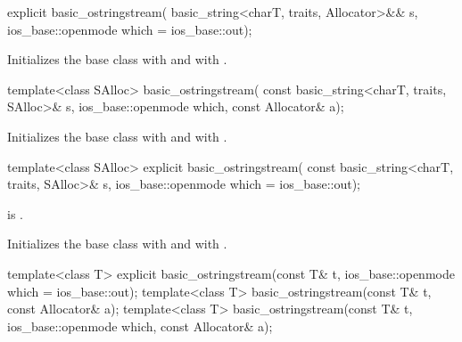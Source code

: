 %
\begin{itemdecl}
explicit basic_ostringstream(
  basic_string<charT, traits, Allocator>&& s,
  ios_base::openmode which = ios_base::out);
\end{itemdecl}

\begin{itemdescr}
\pnum
\effects
Initializes the base class with
and  with
.
\end{itemdescr}

%
\begin{itemdecl}
template<class SAlloc>
  basic_ostringstream(
    const basic_string<charT, traits, SAlloc>& s,
    ios_base::openmode which, const Allocator& a);
\end{itemdecl}

\begin{itemdescr}
\pnum
\effects
Initializes the base class with
and  with
\linebreak{}. %
\end{itemdescr}

%
\begin{itemdecl}
template<class SAlloc>
  explicit basic_ostringstream(
    const basic_string<charT, traits, SAlloc>& s,
    ios_base::openmode which = ios_base::out);
\end{itemdecl}

\begin{itemdescr}
\pnum
\constraints
{} is .

\pnum
\effects
Initializes the base class with
and  with
\linebreak{}. %
\end{itemdescr}

%
\begin{itemdecl}
template<class T>
  explicit basic_ostringstream(const T& t, ios_base::openmode which = ios_base::out);
template<class T>
  basic_ostringstream(const T& t, const Allocator& a);
template<class T>
  basic_ostringstream(const T& t, ios_base::openmode which, const Allocator& a);
\end{itemdecl}

